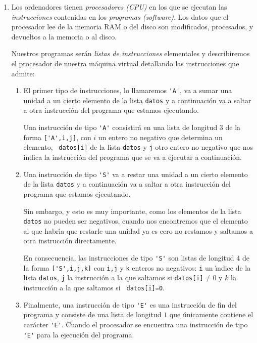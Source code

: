 \begin{appendices}
\begin{enumerate}
\item Los ordenadores tienen {\itshape procesadores (CPU)} en los que se
ejecutan las {\itshape instrucciones} contenidas en los {\itshape programas
(software)}. Los datos que el procesador lee de la memoria RAM o del disco son
modificados, procesados, y devueltos a la memoria o al disco.


Nuestros programas ser\'an {\itshape listas de instrucciones} elementales y 
describiremos el procesador de nuestra m\'aquina virtual detallando las
instrucciones que admite:

\begin{enumerate}
 \item El primer tipo de instrucciones, lo llamaremos  \lstinline|'A'|, va a
sumar una
unidad a un cierto elemento de la lista {\tt datos} y a continuaci\'on va a
saltar a otra instrucci\'on del programa que estamos ejecutando. 

Una instrucci\'on de tipo \lstinline|'A'| consistir\'a en una lista de longitud
$3$ de
la forma 
\lstinline|['A',i,j]|, con $i$ un entero no negativo que determina un elemento,
{\tt
datos[i]} de la lista {\tt datos} y {\tt j} otro entero 
no negativo que nos indica la instrucci\'on del programa que se va a ejecutar a
continuaci\'on. 

\item Una instrucci\'on de tipo \lstinline|'S'| va a restar una unidad
a un cierto elemento de la lista {\tt datos} y a continuaci\'on va a saltar a
otra instrucci\'on del programa que estamos ejecutando. 

Sin embargo, y esto es {\sc muy importante}, como los elementos de la lista {\tt
datos} no pueden ser negativos, cuando nos encontremos que el elemento al que
habr\'{\i}a que restarle una unidad ya es cero no restamos y saltamos a otra
instrucci\'on directamente. 

En consecuencia, las instrucciones de tipo \lstinline|'S'| son listas de
longitud $4$
de la forma \lstinline|['S',i,j,k]| con {\tt i,j} y {\tt k} enteros no
negativos: {\tt i} un
\'{\i}ndice de la lista {\tt datos}, {\tt j} la instrucci\'on a la que saltamos
si
{\tt datos[i]}$\ne 0$ y $k$ la instrucci\'on a la que saltamos si {\tt
datos[i]=0}.
 \item Finalmente, una instrucci\'on de tipo \lstinline|'E'| es una
instrucci\'on de 
 fin del programa y consiste de una lista de longitud $1$ que \'unicamente 
 contiene el car\'acter \lstinline|'E'|. Cuando el procesador se encuentra una
instrucci\'on de tipo \lstinline|'E'| para la ejecuci\'on del programa.
 

\end{enumerate}
\end{enumerate}
\end{appendices}
